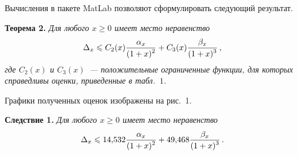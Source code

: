 \begin{multicols}{2}
\smallskip

Вычисления в пакете MatLab позволяют сформулировать следующий результат.

\medskip

\noindent
\textbf{Теорема 2.} \textit{Для любого $x\geqslant 0$ имеет место неравенство
$$
\Delta_x\leqslant
C_2(x)\displaystyle\frac{\displaystyle \alpha_x\mathstrut}{\displaystyle (1+x)^2\mathstrut}+C_3(x)\displaystyle\frac{\displaystyle \beta_x\mathstrut}{\displaystyle (1+x)^3\mathstrut}\,,
$$
где $C_2(x)$ и $C_3(x)$~--- положительные ограниченные функции, для
которых справедливы оценки, приведенные в табл.~$1$.
}

\smallskip

Графики полученных оценок изображены на рис.~1.



\medskip

\noindent
\textbf{Следствие 1.} \textit{Для любого $x\geqslant0$ имеет место неравенство}
$$
\Delta_x\leqslant
14{,}532\displaystyle\frac{\displaystyle \alpha_x\mathstrut}{\displaystyle (1+x)^2\mathstrut}+49{,}468\displaystyle\frac{\displaystyle \beta_x\mathstrut}{\displaystyle (1+x)^3\mathstrut}\,.
$$

\end{multicols}

